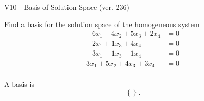 \begin{exercise}
  \begin{exerciseTitle}V10 - Basis of Solution Space (ver. 236)\end{exerciseTitle}
  \begin{exerciseStatement}
    Find a basis for the solution space of the homogeneous system 
\begin{align*}
 -6 x_ 1 -4 x_ 2 + 5 x_ 3 + 2 x_ 4 &= 0  \\ 
  -2 x_ 1 + 1 x_ 3 + 4 x_ 4 &= 0  \\ 
  -3 x_ 1 -1 x_ 3 -1 x_ 4 &= 0  \\ 
  3 x_ 1 + 5 x_ 2 + 4 x_ 3 + 3 x_ 4 &= 0  \\ 
 \end{align*}


 
  \end{exerciseStatement}

  \begin{exerciseAnswer}
   A basis is   
\[\left\{\right\}.\]

  


  \end{exerciseAnswer}
\end{exercise}